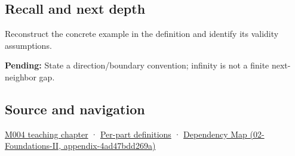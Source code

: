 \subsection{Recall and next depth}\label{recall-and-next-depth}

Reconstruct the concrete example in the definition and identify its validity assumptions.

\textbf{Pending:} State a direction/boundary convention; infinity is not a finite next-neighbor gap.

\subsection{Source and navigation}\label{source-and-navigation}

\href{Continuous\%20Notes/Computing\%20Foundations\%20-\%20From\%20Bits\%20to\%20C++\%20and\%20Systems\%20APIs\#A\%20stretching\%20ruler\%20for\%20real-valued\%20quantities}{M004 teaching chapter} · \hyperref[appendix-fd090d982a15]{Per-part definitions} · \href{}{Dependency Map (02-Foundations-II, appendix-4ad47bdd269a)}

